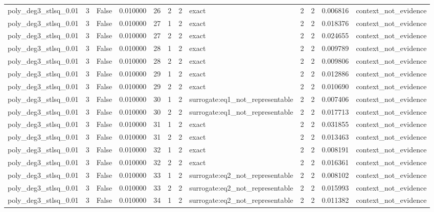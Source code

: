 \begin{tabular}{lrrrrrrlrrrl}
poly\_deg3\_stlsq\_0.01 & 3 & False & 0.010000 & 26 & 2 & 2 & exact & 2 & 2 & 0.006816 & context\_not\_evidence \\
poly\_deg3\_stlsq\_0.01 & 3 & False & 0.010000 & 27 & 1 & 2 & exact & 2 & 2 & 0.018376 & context\_not\_evidence \\
poly\_deg3\_stlsq\_0.01 & 3 & False & 0.010000 & 27 & 2 & 2 & exact & 2 & 2 & 0.024655 & context\_not\_evidence \\
poly\_deg3\_stlsq\_0.01 & 3 & False & 0.010000 & 28 & 1 & 2 & exact & 2 & 2 & 0.009789 & context\_not\_evidence \\
poly\_deg3\_stlsq\_0.01 & 3 & False & 0.010000 & 28 & 2 & 2 & exact & 2 & 2 & 0.009806 & context\_not\_evidence \\
poly\_deg3\_stlsq\_0.01 & 3 & False & 0.010000 & 29 & 1 & 2 & exact & 2 & 2 & 0.012886 & context\_not\_evidence \\
poly\_deg3\_stlsq\_0.01 & 3 & False & 0.010000 & 29 & 2 & 2 & exact & 2 & 2 & 0.010690 & context\_not\_evidence \\
poly\_deg3\_stlsq\_0.01 & 3 & False & 0.010000 & 30 & 1 & 2 & surrogate:eq1\_not\_representable & 2 & 2 & 0.007406 & context\_not\_evidence \\
poly\_deg3\_stlsq\_0.01 & 3 & False & 0.010000 & 30 & 2 & 2 & surrogate:eq1\_not\_representable & 2 & 2 & 0.017713 & context\_not\_evidence \\
poly\_deg3\_stlsq\_0.01 & 3 & False & 0.010000 & 31 & 1 & 2 & exact & 2 & 2 & 0.031855 & context\_not\_evidence \\
poly\_deg3\_stlsq\_0.01 & 3 & False & 0.010000 & 31 & 2 & 2 & exact & 2 & 2 & 0.013463 & context\_not\_evidence \\
poly\_deg3\_stlsq\_0.01 & 3 & False & 0.010000 & 32 & 1 & 2 & exact & 2 & 2 & 0.008191 & context\_not\_evidence \\
poly\_deg3\_stlsq\_0.01 & 3 & False & 0.010000 & 32 & 2 & 2 & exact & 2 & 2 & 0.016361 & context\_not\_evidence \\
poly\_deg3\_stlsq\_0.01 & 3 & False & 0.010000 & 33 & 1 & 2 & surrogate:eq2\_not\_representable & 2 & 2 & 0.008102 & context\_not\_evidence \\
poly\_deg3\_stlsq\_0.01 & 3 & False & 0.010000 & 33 & 2 & 2 & surrogate:eq2\_not\_representable & 2 & 2 & 0.015993 & context\_not\_evidence \\
poly\_deg3\_stlsq\_0.01 & 3 & False & 0.010000 & 34 & 1 & 2 & surrogate:eq2\_not\_representable & 2 & 2 & 0.011382 & context\_not\_evidence \\

\end{tabular}
